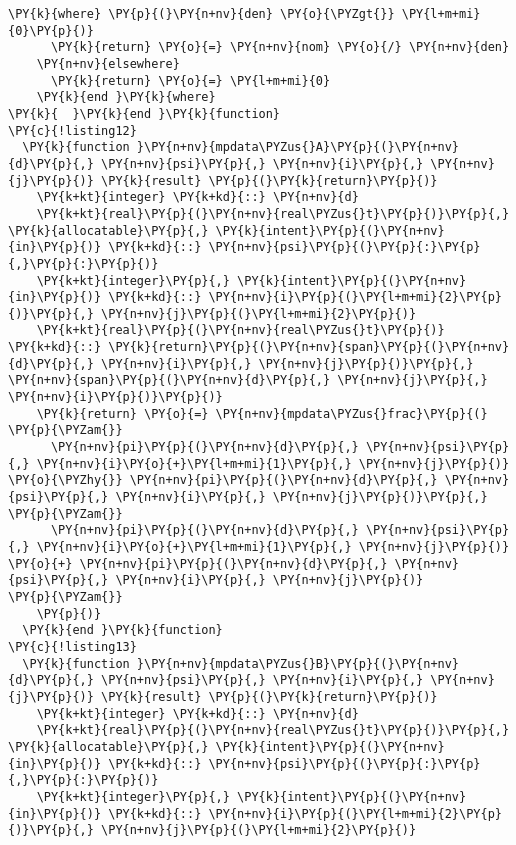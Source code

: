 \begin{Verbatim}[commandchars=\\\{\}]
    \PY{k}{where} \PY{p}{(}\PY{n+nv}{den} \PY{o}{\PYZgt{}} \PY{l+m+mi}{0}\PY{p}{)}
      \PY{k}{return} \PY{o}{=} \PY{n+nv}{nom} \PY{o}{/} \PY{n+nv}{den}
    \PY{n+nv}{elsewhere}
      \PY{k}{return} \PY{o}{=} \PY{l+m+mi}{0}
    \PY{k}{end }\PY{k}{where}
\PY{k}{  }\PY{k}{end }\PY{k}{function}
\PY{c}{!listing12}
  \PY{k}{function }\PY{n+nv}{mpdata\PYZus{}A}\PY{p}{(}\PY{n+nv}{d}\PY{p}{,} \PY{n+nv}{psi}\PY{p}{,} \PY{n+nv}{i}\PY{p}{,} \PY{n+nv}{j}\PY{p}{)} \PY{k}{result} \PY{p}{(}\PY{k}{return}\PY{p}{)}
    \PY{k+kt}{integer} \PY{k+kd}{::} \PY{n+nv}{d}
    \PY{k+kt}{real}\PY{p}{(}\PY{n+nv}{real\PYZus{}t}\PY{p}{)}\PY{p}{,} \PY{k}{allocatable}\PY{p}{,} \PY{k}{intent}\PY{p}{(}\PY{n+nv}{in}\PY{p}{)} \PY{k+kd}{::} \PY{n+nv}{psi}\PY{p}{(}\PY{p}{:}\PY{p}{,}\PY{p}{:}\PY{p}{)}
    \PY{k+kt}{integer}\PY{p}{,} \PY{k}{intent}\PY{p}{(}\PY{n+nv}{in}\PY{p}{)} \PY{k+kd}{::} \PY{n+nv}{i}\PY{p}{(}\PY{l+m+mi}{2}\PY{p}{)}\PY{p}{,} \PY{n+nv}{j}\PY{p}{(}\PY{l+m+mi}{2}\PY{p}{)}
    \PY{k+kt}{real}\PY{p}{(}\PY{n+nv}{real\PYZus{}t}\PY{p}{)} \PY{k+kd}{::} \PY{k}{return}\PY{p}{(}\PY{n+nv}{span}\PY{p}{(}\PY{n+nv}{d}\PY{p}{,} \PY{n+nv}{i}\PY{p}{,} \PY{n+nv}{j}\PY{p}{)}\PY{p}{,} \PY{n+nv}{span}\PY{p}{(}\PY{n+nv}{d}\PY{p}{,} \PY{n+nv}{j}\PY{p}{,} \PY{n+nv}{i}\PY{p}{)}\PY{p}{)}
    \PY{k}{return} \PY{o}{=} \PY{n+nv}{mpdata\PYZus{}frac}\PY{p}{(}                              \PY{p}{\PYZam{}}
      \PY{n+nv}{pi}\PY{p}{(}\PY{n+nv}{d}\PY{p}{,} \PY{n+nv}{psi}\PY{p}{,} \PY{n+nv}{i}\PY{o}{+}\PY{l+m+mi}{1}\PY{p}{,} \PY{n+nv}{j}\PY{p}{)} \PY{o}{\PYZhy{}} \PY{n+nv}{pi}\PY{p}{(}\PY{n+nv}{d}\PY{p}{,} \PY{n+nv}{psi}\PY{p}{,} \PY{n+nv}{i}\PY{p}{,} \PY{n+nv}{j}\PY{p}{)}\PY{p}{,}           \PY{p}{\PYZam{}}
      \PY{n+nv}{pi}\PY{p}{(}\PY{n+nv}{d}\PY{p}{,} \PY{n+nv}{psi}\PY{p}{,} \PY{n+nv}{i}\PY{o}{+}\PY{l+m+mi}{1}\PY{p}{,} \PY{n+nv}{j}\PY{p}{)} \PY{o}{+} \PY{n+nv}{pi}\PY{p}{(}\PY{n+nv}{d}\PY{p}{,} \PY{n+nv}{psi}\PY{p}{,} \PY{n+nv}{i}\PY{p}{,} \PY{n+nv}{j}\PY{p}{)}            \PY{p}{\PYZam{}}
    \PY{p}{)}  
  \PY{k}{end }\PY{k}{function}
\PY{c}{!listing13}
  \PY{k}{function }\PY{n+nv}{mpdata\PYZus{}B}\PY{p}{(}\PY{n+nv}{d}\PY{p}{,} \PY{n+nv}{psi}\PY{p}{,} \PY{n+nv}{i}\PY{p}{,} \PY{n+nv}{j}\PY{p}{)} \PY{k}{result} \PY{p}{(}\PY{k}{return}\PY{p}{)}
    \PY{k+kt}{integer} \PY{k+kd}{::} \PY{n+nv}{d}
    \PY{k+kt}{real}\PY{p}{(}\PY{n+nv}{real\PYZus{}t}\PY{p}{)}\PY{p}{,} \PY{k}{allocatable}\PY{p}{,} \PY{k}{intent}\PY{p}{(}\PY{n+nv}{in}\PY{p}{)} \PY{k+kd}{::} \PY{n+nv}{psi}\PY{p}{(}\PY{p}{:}\PY{p}{,}\PY{p}{:}\PY{p}{)} 
    \PY{k+kt}{integer}\PY{p}{,} \PY{k}{intent}\PY{p}{(}\PY{n+nv}{in}\PY{p}{)} \PY{k+kd}{::} \PY{n+nv}{i}\PY{p}{(}\PY{l+m+mi}{2}\PY{p}{)}\PY{p}{,} \PY{n+nv}{j}\PY{p}{(}\PY{l+m+mi}{2}\PY{p}{)}

\end{Verbatim}
